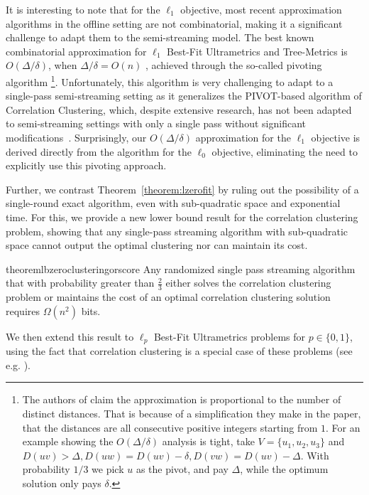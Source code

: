 \documentclass{article}
\newcommand{\set}[1]{\{#1\}}
\begin{document}
It is interesting to note that for the $\ell_1$ objective, most recent approximation algorithms in the offline setting are not combinatorial, making it a significant challenge to adapt them to the semi-streaming model. 
The best known combinatorial approximation for \(\ell_1\) Best-Fit Ultrametrics and Tree-Metrics is \(O(\Delta/\delta)\), when \(\Delta/\delta = O(n)\) \cite{charikar, mcgregor}, achieved through the so-called pivoting algorithm
\footnote{The authors of \cite{charikar} claim the approximation is proportional to the number of distinct distances. That is because of a simplification they make in the paper, that the distances are all consecutive positive integers starting from $1$. For an example showing the $O(\Delta/\delta)$ analysis is tight, take $V=\set{u_1,u_2,u_3}$ and $D(uv)>\Delta, D(uw) = D(uv)-\delta, D(vw)=D(uv)-\Delta$. With probability $1/3$ we pick $u$ as the pivot, and pay $\Delta$, while the optimum solution only pays $\delta$.}.
Unfortunately, this algorithm is very challenging to adapt to a single-pass semi-streaming setting as it generalizes the PIVOT-based algorithm of Correlation Clustering, which, despite extensive research, has not been adapted to semi-streaming settings with only a single pass without significant modifications~\cite{BehnezhadCMT22, BehnezhadCMT23, CambusKLPU24, chakrabarty2023single}. 
Surprisingly, our \(O(\Delta/\delta)\) approximation for the \(\ell_1\) objective is derived directly from the algorithm for the \(\ell_0\) objective, eliminating the need to explicitly use this pivoting approach.

Further, we contrast Theorem~\ref{theorem:lzerofit} by ruling out the possibility of a single-round exact algorithm, even with sub-quadratic space and exponential time. For this, we provide a new lower bound result for the correlation clustering problem, showing that any single-pass streaming algorithm with sub-quadratic space cannot output the optimal clustering nor can maintain its cost.

\begin{restatable}{theorem}{lbzeroclusteringorscore}
    Any randomized single pass streaming algorithm that with probability greater than $\frac{2}{3}$ either solves the correlation clustering problem or maintains the cost of an optimal correlation clustering solution  requires $\Omega(n^2)$ bits.
\end{restatable}

We then extend this result to $\ell_p$ Best-Fit Ultrametrics problems for $p \in \{ 0,1 \}$, using the fact that correlation clustering is a special case of these problems (see e.g. \cite{charikar}).
\end{document}
